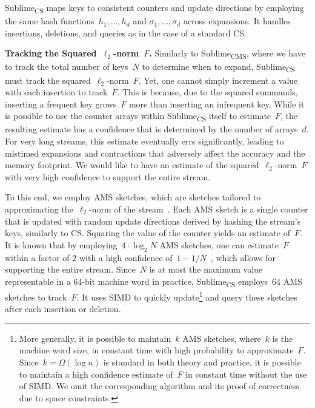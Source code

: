 \documentclass[sigconf]{acmart}
\newcommand{\sketch}{Sublime}
\newcommand{\sketchcms}{\sketch\textsubscript{CMS}\xspace}
\newcommand{\sketchcs}{\sketch\textsubscript{CS}\xspace}
\begin{document}
\sketchcs maps keys to consistent counters and update directions by employing the same hash functions~$h_1,\dots,h_d$ and $\sigma_1,\dots,\sigma_d$ across expansions.
It handles insertions, deletions, and queries as in the case of a standard CS.

\textbf{Tracking the Squared~$\ell_2$-norm~$F$.}
Similarly to \sketchcms, where we have to track the total number of keys~$N$ to determine when to expand, \sketchcs must track the squared~$\ell_2$-norm~$F$.
Yet, one cannot simply increment a value with each insertion to track~$F$. 
This is because, due to the squared summands, inserting a frequent key grows~$F$ more than inserting an infrequent key.
While it is possible to use the counter arrays within \sketchcs itself to estimate~$F$, the resulting estimate has a confidence that is determined by the number of arrays~$d$.
For very long streams, this estimate eventually errs significantly, leading to mistimed expansions and contractions that adversely affect the accuracy and the memory footprint.
We would like to have an estimate of the squared~$\ell_2$-norm~$F$ with very high confidence to support the entire stream. 

To this end, we employ AMS sketches, which are sketches tailored to approximating the~$\ell_2$-norm of the stream~\cite{AMS}.
Each AMS sketch is a single counter that is updated with random update directions derived by hashing the stream's keys, similarly to CS.
Squaring the value of the counter yields an estimate of~$F$.
It is known that by employing~$4 \cdot \log_2 N$ AMS sketches, one can estimate~$F$ within a factor of 2 with a high confidence of~$1-1/N$~\cite{AMS}, which allows for supporting the entire stream.
Since~$N$ is at most the maximum value representable in a 64-bit machine word in practice, \sketchcs employs~64 AMS sketches to track~$F$.
It uses SIMD to quickly update\footnote{
    More generally, it is possible to maintain~$k$ AMS sketches, where~$k$ is the machine word size, in constant time with high probability to approximate~$F$.
    Since~$k=\Omega(\log n)$ is standard in both theory and practice, it is possible to maintain a high confidence estimate of~$F$ in constant time without the use of SIMD.
    We omit the corresponding algorithm and its proof of correctness due to space constraints.
} and query these sketches after each insertion or deletion.
\end{document}
